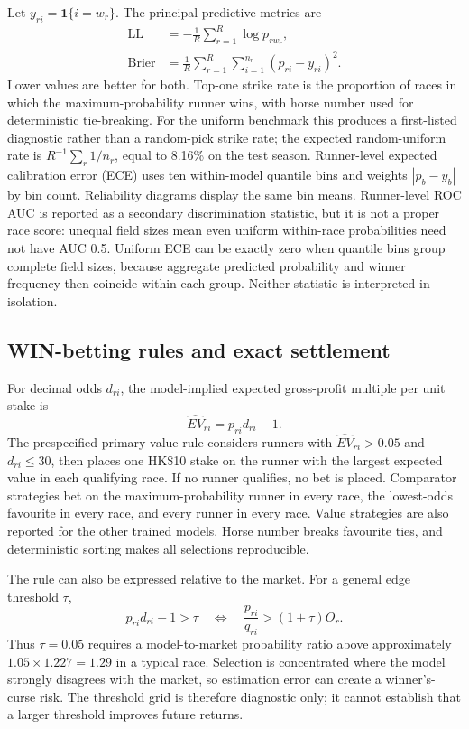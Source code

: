 Let $y_{ri}=\mathbf{1}\{i=w_r\}$. The principal predictive metrics are
\begin{align}
\mathrm{LL}&=-\frac{1}{R}\sum_{r=1}^{R}\log p_{rw_r}, \label{eq:logloss}\\
\mathrm{Brier}&=\frac{1}{R}\sum_{r=1}^{R}\sum_{i=1}^{n_r}(p_{ri}-y_{ri})^2. \label{eq:brier}
\end{align}
Lower values are better for both. Top-one strike rate is the proportion of races in which the maximum-probability runner wins, with horse number used for deterministic tie-breaking. For the uniform benchmark this produces a first-listed diagnostic rather than a random-pick strike rate; the expected random-uniform rate is $R^{-1}\sum_r 1/n_r$, equal to 8.16\% on the test season. Runner-level expected calibration error (ECE) uses ten within-model quantile bins and weights $|\bar p_b-\bar y_b|$ by bin count. Reliability diagrams display the same bin means. Runner-level ROC AUC is reported as a secondary discrimination statistic, but it is not a proper race score: unequal field sizes mean even uniform within-race probabilities need not have AUC 0.5. Uniform ECE can be exactly zero when quantile bins group complete field sizes, because aggregate predicted probability and winner frequency then coincide within each group. Neither statistic is interpreted in isolation.

\subsection{WIN-betting rules and exact settlement}\label{sec:methods-betting}
For decimal odds $d_{ri}$, the model-implied expected gross-profit multiple per unit stake is
\begin{equation}
\widehat{EV}_{ri}=p_{ri}d_{ri}-1.
\label{eq:expected-value}
\end{equation}
The prespecified primary value rule considers runners with $\widehat{EV}_{ri}>0.05$ and $d_{ri}\leq30$, then places one HK\$10 stake on the runner with the largest expected value in each qualifying race. If no runner qualifies, no bet is placed. Comparator strategies bet on the maximum-probability runner in every race, the lowest-odds favourite in every race, and every runner in every race. Value strategies are also reported for the other trained models. Horse number breaks favourite ties, and deterministic sorting makes all selections reproducible.

The rule can also be expressed relative to the market. For a general edge threshold $\tau$,
\begin{equation}
p_{ri}d_{ri}-1>\tau
\quad\Longleftrightarrow\quad
\frac{p_{ri}}{q_{ri}}>(1+\tau)O_r.
\label{eq:value-ratio}
\end{equation}
Thus $\tau=0.05$ requires a model-to-market probability ratio above approximately $1.05\times1.227=1.29$ in a typical race. Selection is concentrated where the model strongly disagrees with the market, so estimation error can create a winner's-curse risk. The threshold grid is therefore diagnostic only; it cannot establish that a larger threshold improves future returns.

